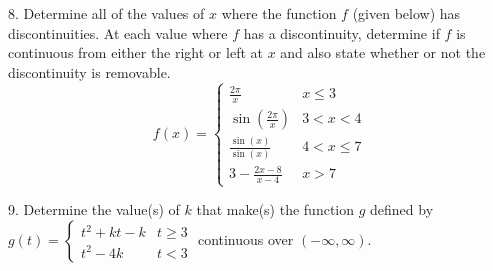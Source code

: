 \documentclass[10pt,oneside,]{book}
\newcommand{\lt}{<}
\newcommand{\gt}{>}
\theoremstyle{plain}
\theoremstyle{definition}
\numberwithin{equation}{section}
\newcounter{figstack}
\newcounter{figindex}
\newlength\fight
\newcommand\pushValignCaptionBottom[5][b]{%
\stepcounter{figstack}%
\expandafter\def\csname %
figalign\romannumeral\value{figstack}\endcsname{#1}%
\expandafter\def\csname %
figtype\romannumeral\value{figstack}\endcsname{#2}%
\expandafter\def\csname %
figwd\romannumeral\value{figstack}\endcsname{#3}%
\expandafter\def\csname %
figcontent\romannumeral\value{figstack}\endcsname{#4}%
\expandafter\def\csname %
figcap\romannumeral\value{figstack}\endcsname{#5}%
\setbox0=\hbox{%
\begin{#2}{#3}#4\end{#2}}%
\ifdim\dimexpr\ht0+\dp0\relax>\fight\global\setlength{\fight}{%
\dimexpr\ht0+\dp0\relax}\fi%
}
\newcommand\popValignCaptionBottom{%
\setcounter{figindex}{0}%
\hfill%
\whiledo{\value{figindex}<\value{figstack}}{%
\stepcounter{figindex}%
\def\tmp{\csname figwd\romannumeral\value{figindex}\endcsname}%
\begin{\csname figtype\romannumeral\value{figindex}\endcsname}[t]{\tmp}%
\centering%
\stackinset{c}{}%
{\csname figalign\romannumeral\value{figindex}\endcsname}{}%
{\csname figcontent\romannumeral\value{figindex}\endcsname}%
{\rule{0pt}{\fight}}\par%
\csname figcap\romannumeral\value{figindex}\endcsname%
\end{\csname figtype\romannumeral\value{figindex}\endcsname}%
\hfill%
}%
\setcounter{figstack}{0}%
\setlength{\fight}{0pt}%
\hfill%
}
\newcommand{\fe}[2]{#1\mathopen{}\left(#2\right)\mathclose{}}
\newcommand{\ointerval}[2]{\left(#1,#2\right)}
\begin{document}
\begin{exerciselist}
\par\smallskip
\item[8.]\hypertarget{exercise-144}{\null}Determine all of the values of \(x\) where the function \(f\) (given below) has discontinuities.  At each value where \(f\) has a discontinuity, determine if \(f\) is continuous from either the right or left at \(x\) and also state whether or not the discontinuity is removable.%
\[\fe{f}{x}=\begin{cases}\frac{2\pi}{x}&x\leq3\\\fe{\sin}{\frac{2\pi}{x}}&3\lt x\lt 4\\\frac{\fe{\sin}{x}}{\fe{\sin}{x}}&4\lt x\leq7\\3-\frac{2x-8}{x-4}&x\gt7\end{cases}\]\par\smallskip
\item[9.]\hypertarget{exercise-145}{\null}Determine the value(s) of \(k\) that make(s) the function \(g\) defined by \(\fe{g}{t}=\begin{cases}t^2+kt-k&t\geq3\\t^2-4k&t\lt 3\end{cases}\) continuous over \(\ointerval{-\infty}{\infty}\).%
\par\smallskip
\end{exerciselist}
\end{document}

